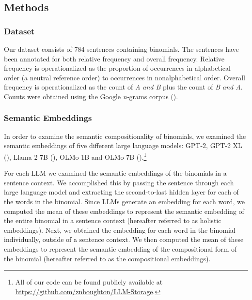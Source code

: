 \documentclass[
  12pt,
  letterpaper,
]{scrreprt}
\begin{document}
\subsection{Methods}\label{methods-8}

\subsubsection{Dataset}\label{dataset-1}

Our dataset consists of 784 sentences containing binomials. The
sentences have been annotated for both relative frequency and overall
frequency. Relative frequency is operationalized as the proportion of
occurrences in alphabetical order (a neutral reference order) to
occurrences in nonalphabetical order. Overall frequency is
operationalized as the count of \emph{A and B} plus the count of \emph{B
and A}. Counts were obtained using the Google \emph{n-}grams corpus
().

\subsubsection{Semantic Embeddings}\label{semantic-embeddings}

In order to examine the semantic compositionality of binomials, we
examined the semantic embeddings of five different large language
models: GPT-2, GPT-2 XL
(),
Llama-2 7B (),
OLMo 1B and OLMo 7B
().\footnote{All of our code can be found publicly available at
  \url{https://github.com/znhoughton/LLM-Storage}.}

For each LLM we examined the semantic embeddings of the binomials in a
sentence context. We accomplished this by passing the sentence through
each large language model and extracting the second-to-last hidden layer
for each of the words in the binomial. Since LLMs generate an embedding
for each word, we computed the mean of these embeddings to represent the
semantic embedding of the entire binomial in a sentence context
(hereafter referred to as holistic embeddings). Next, we obtained the
embedding for each word in the binomial individually, outside of a
sentence context. We then computed the mean of these embeddings to
represent the semantic embedding of the compositional form of the
binomial (hereafter referred to as the compositional embeddings).
\end{document}
